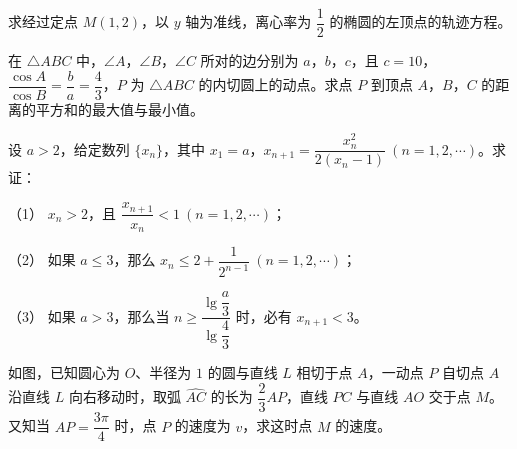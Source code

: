 \begin{question}
求经过定点 $M(1,2)$，以 $y$ 轴为准线，离心率为 $\dfrac12$ 的椭圆的左顶点的轨迹方程。

\end{question}
\begin{question}
在 $\triangle ABC$ 中，$\angle A$，$\angle B$，$\angle C$ 所对的边分别为 $a$，$b$，$c$，且 $c=10$，$\dfrac{\cos A}{\cos B}=\dfrac ba=\dfrac43$，$P$ 为 $\triangle ABC$ 的内切圆上的动点。求点 $P$ 到顶点 $A$，$B$，$C$ 的距离的平方和的最大值与最小值。

\end{question}
\begin{question}
设 $a>2$，给定数列 $\{x_n\}$，其中 $x_1=a$，$x_{n+1}=\dfrac{x_n^2}{2(x_n-1)}\ (n=1,2,\cdots)$。求证：

（1） $x_n>2$，且 $\dfrac{x_{n+1}}{x_n}<1\ (n=1,2,\cdots)$；

（2） 如果 $a\leqslant3$，那么 $x_n\leqslant2+\dfrac{1}{2^{n-1}}\ (n=1,2,\cdots)$；

（3） 如果 $a>3$，那么当 $n\geqslant\dfrac{\lg\dfrac a3}{\lg\dfrac43}$ 时，必有 $x_{n+1}<3$。

\Needspace{0.4\textheight}
\end{question}
\begin{question}
如图，已知圆心为 $O$、半径为 $1$ 的圆与直线 $L$ 相切于点 $A$，一动点 $P$ 自切点 $A$ 沿直线 $L$ 向右移动时，取弧 $\widehat{AC}$ 的长为 $\dfrac23 AP$，直线 $PC$ 与直线 $AO$ 交于点 $M$。又知当 $AP=\dfrac{3\pi}{4}$ 时，点 $P$ 的速度为 $v$，求这时点 $M$ 的速度。
\nopagebreak[4]
\begin{center}\end{center}
\nopagebreak[4]

\end{question}